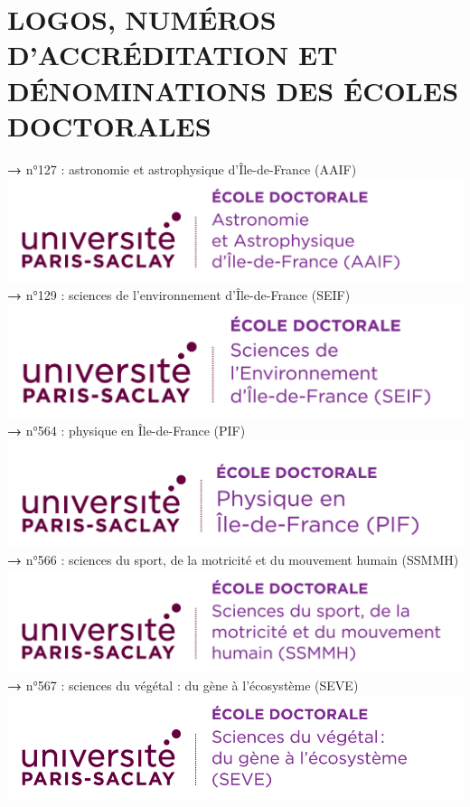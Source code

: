\documentclass[english,12pt,a4paper]{book}
\begin{document}
\section{LOGOS, NUMÉROS D’ACCRÉDITATION ET DÉNOMINATIONS DES ÉCOLES DOCTORALES}

\noindent \textbf{\color{Prune}→} n°127 : astronomie et astrophysique d'Île-de-France (AAIF) \\
\includegraphics[scale=.7]{logo_usp_AAIF.png}\\

\noindent \textbf{\color{Prune}→} n°129 : sciences de l'environnement d’Île-de-France (SEIF) \\
\includegraphics[scale=.7]{logo_usp_SEIF.png}\\

\noindent \textbf{\color{Prune}→} n°564 : physique en Île-de-France (PIF)\\    \includegraphics[scale=.7]{logo_usp_PIF.png}\\

\noindent \textbf{\color{Prune}→} n°566 : sciences du sport, de la motricité et du mouvement humain (SSMMH)\\
\includegraphics[scale=.7]{logo_usp_SSMMH.png}\\
\newpage
\noindent \textbf{\color{Prune}→} n°567 : sciences du végétal : du gène à l'écosystème (SEVE)\\
\includegraphics[scale=.55]{logo_usp_SEVE.png}\\
\end{document}
